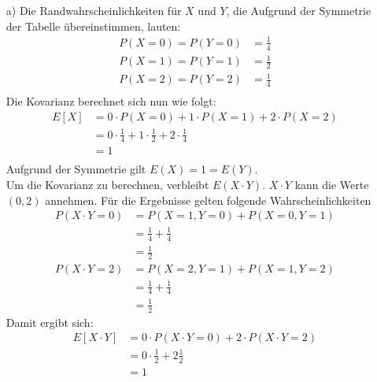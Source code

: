 \begin{enumerate}
	\item[a)] Die Randwahrscheinlichkeiten für $X$ und $Y$, die Aufgrund der Symmetrie der Tabelle übereinstimmen, lauten:
	\begin{equation*}
		\begin{split}
			P(X = 0) = P(Y = 0) &= \frac{1}{4}\\
			P(X = 1) = P(Y = 1) &= \frac{1}{2}\\
			P(X = 2) = P(Y = 2) &= \frac{1}{4}\\
		\end{split}
	\end{equation*}
	Die Kovarianz berechnet sich nun wie folgt:
	\begin{equation*}
		\begin{split}
			E[X] 	&= 0 \cdot P(X = 0) + 1 \cdot P(X = 1) + 2 \cdot P(X = 2)\\
					&= 0 \cdot \frac{1}{4} + 1 \cdot \frac{1}{2} + 2 \cdot \frac{1}{4}\\
					&= 1\\
		\end{split}
	\end{equation*}
	Aufgrund der Symmetrie gilt $E(X) = 1 = E(Y)$.\\
	Um die Kovarianz zu berechnen, verbleibt $E(X\cdot Y)$. $X \cdot Y$ kann die Werte $(0,2)$ annehmen. Für die Ergebnisse gelten folgende Wahrscheinlichkeiten
	\begin{equation*}
		\begin{split}
			P(X \cdot Y = 0) 	&= P(X = 1, Y = 0) + P(X = 0, Y = 1)\\
								&= \frac{1}{4} + \frac{1}{4}\\
								&= \frac{1}{2}\\
			P(X \cdot Y = 2)	&= P(X = 2, Y = 1) + P(X = 1, Y = 2)\\
								&= \frac{1}{4} + \frac{1}{4}\\
								&= \frac{1}{2}
		\end{split}
	\end{equation*}
	Damit ergibt sich:
	\begin{equation*}
		\begin{split}
			E[X \cdot Y]	&= 0 \cdot P(X \cdot Y = 0) + 2 \cdot P(X \cdot Y = 2)\\
							&= 0 \cdot \frac{1}{2} + 2 \frac{1}{2}\\
							&= 1
		\end{split}
	\end{equation*}

\end{enumerate}
